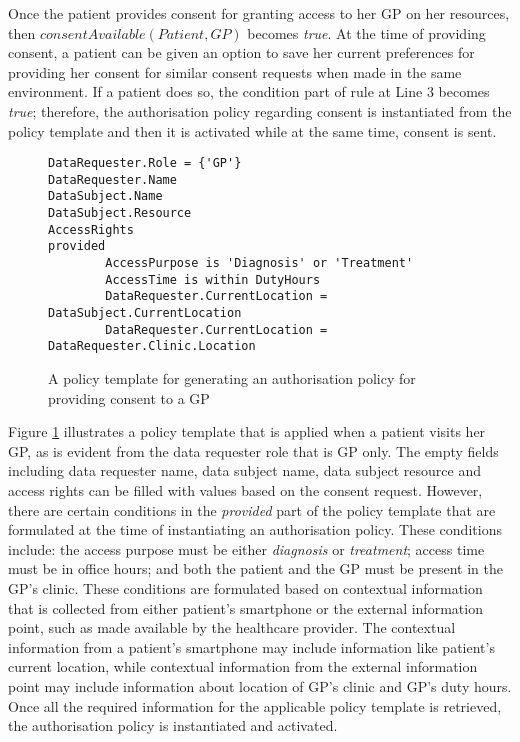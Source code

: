\documentclass[10pt, conference, compsocconf]{IEEEtran}
\newcommand{\Keywords}{\lstset{keywords={provided,is,within,and,or,(,),TRUE,FALSE,tr-policy}}}
\begin{document}
Once the patient provides consent for granting access to her GP on her resources, then $\mathit{consentAvailable(Patient, GP)}$ becomes \emph{true}. At the time of providing consent, a patient can be given an option to save her current preferences for providing her consent for similar consent requests when made in the same environment. If a patient does so, the condition part of rule at Line 3 becomes \emph{true}; therefore, the authorisation policy regarding consent is instantiated from the policy template and then it is activated while at the same time, consent is sent.


\begin{figure} [htp]
\Keywords
\begin{lstlisting}[style=AMMA,breaklines,mathescape,rulesepcolor=\color{black}]
DataRequester.Role = {'GP'}
DataRequester.Name
DataSubject.Name
DataSubject.Resource
AccessRights
provided
		AccessPurpose is 'Diagnosis' or 'Treatment'
		AccessTime is within DutyHours
		DataRequester.CurrentLocation = DataSubject.CurrentLocation
		DataRequester.CurrentLocation = DataRequester.Clinic.Location
\end{lstlisting}
\caption{A policy template for generating an authorisation policy for providing consent to a GP}
\label{fig:gp-policy-template}
\end{figure}

Figure \ref{fig:gp-policy-template} illustrates a policy template that is applied when a patient visits her GP, as is evident from the data requester role that is GP only. The empty fields including data requester name, data subject name, data subject resource and access rights can be filled with values based on the consent request. However, there are certain conditions in the \emph{provided} part of the policy template that are formulated at the time of instantiating an authorisation policy. These conditions include: the access purpose must be either \emph{diagnosis} or \emph{treatment}; access time must be in office hours; and both the patient and the GP must be present in the GP's clinic. These conditions are formulated based on contextual information that is collected from either patient's smartphone or the external information point, such as made available by the healthcare provider. The contextual information from a patient's smartphone may include information like patient's current location, while contextual information from the external information point may include information about location of GP's clinic and GP's duty hours. Once all the required information for the applicable policy template is retrieved, the authorisation policy is instantiated and activated.
\end{document}
